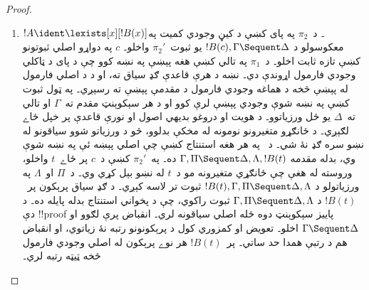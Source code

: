 \documentclass[../../../include/open-logic-section]{subfiles}
\begin{document}
\begin{proof}
\begin{enumerate}
کنه، ترلاسه شوے شي سم ثبوت نۀ دے، ځکه د $\lforall[x][!B(x)]$ هغه !!{formula}s مو لرې کړي چې د \LeftR{\lforall} په ځينو استنتاجونو کښې فعال وو۔ دغه استنتاجونه مو په دې بڼه «استنتاجونو» بدل کړي دي:
\[
  \AxiomC{}
  \RightLabel{$\pi_t$}
  \Deduce$!B(t), \Pi \fCenter \Lambda$
  \RightLabel{\LeftR{\lforall}}
  \UnaryInf$\Pi \fCenter \Lambda$
  \DisplayProof
  \]
له پاسه تر ښکته د ثبوت ونې ته راځو۔ په هره څانګه کښې د زياتېدونکو سياقونو له نښو څخه ځانګړي متغيرونه تازه کوو۔ تر تعويض مخکې د~$t$ له نښو څخه د~$\pi_1'$ ځانګړي متغيرونه هم تازه کوو۔ په هرې قاعدې کښې يو شان اضافي سياقونه ساتو او هر داسې «استنتاج» په دې بدلوو:
\[
  \AxiomC{}
  \RightLabel{$\Subst{\pi_1'}{t}{c}[\Pi \Sequent \Lambda]$}
  \Deduce$\Gamma, \Pi \fCenter \Delta, \Lambda, !B(t)$
  \AxiomC{}
  \RightLabel{$\pi_t[\Gamma \Sequent \Delta]$}
  \Deduce$!B(t), \Gamma, \Pi \fCenter \Delta, \Lambda$
  \RightLabel{\CutCS}
  \BinaryInf$\Gamma, \Pi \fCenter \Delta, \Lambda$
  \DisplayProof
  \]
د ونې په هر سېکوېنټ کښې د~$\Gamma$ او~$\Delta$ يو يو نقل ورزياتېږي۔ په رسم کښې ښے فرعي !!{proof} د پخوانۍ مقدمې له پاسه تر ښکته رغول شوې بڼه ده، چې اضافي سياق هم لري۔ دا بدلون د \LeftR{\lforall} په هر هغه ځاے کښې کوو چې اصلي پېښه ئې په نښه وي۔ نورې قاعدې خپل ګډ سياق ساتي۔ پاييز سېکوېنټ $\Gamma, \Gamma \Sequent \Delta, \Delta$ دے۔ د انقباض د منلو وړتيا ولګوئ، چې د~$\Gamma \Sequent \Delta$ يو !!a{proof} شي، او $\pi$ پرې بدل کړئ۔ پر $\lforall[x][!B(x)]$ يو پرېکون مو پر $!B(t)$ په (ښايي ډېرو) پرېکونونو بدل کړ، خو دا ټول د ټيټې رتبې دي۔ په $\pi_1$ يا $\pi_2$ کښې پخوا موجود پرېکونونه هم پاتې وي، خو هغه هم ټول د ټيټې رتبې دي۔
  \item $!A \ident \lexists[x][!B(x)]$۔ د~$\pi_2$ په پای کښې د کيڼ وجودي کميت په معکوسولو د $!B(c), \Gamma \Sequent \Delta$ يو ثبوت~$\pi_2'$ واخلو۔ $c$ په دواړو اصلي ثبوتونو کښې تازه ثابت اخلو۔ د~$\pi_1$ په تالي کښې هغه پېښې په نښه کوو چې د پای د ټاکلي وجودي فارمول اړوندې دي۔ نښه د هرې قاعدې ګډ سياق ته، او د \RightR{\lexists} د اصلي فارمول له پېښې څخه د هماغه وجودي فارمول د مقدمې پېښې ته رسېږي۔ په ټول ثبوت کښې په نښه شوې وجودي پېښې لرې کوو او د هر سېکوېنټ مقدم ته~$\Gamma$ او تالي ته~$\Delta$ يو ځل ورزياتوو۔ د هويت او دروغو بديهي اصول او نورې قاعدې پر خپل ځاے لګېږي۔ د ځانګړو متغيرونو نومونه له مخکې بدلوو، څو د ورزياتو شوو سياقونو له نښو سره ګډ نۀ شي۔
  د~\RightR{\lexists} په هر هغه استنتاج کښې چې اصلي پېښه ئې په نښه شوې وي، بدله مقدمه $\Gamma, \Pi \Sequent \Delta, \Lambda, !B(t)$ ده۔ په~$\pi_2'$ کښې د~$c$ پر ځاے~$t$ واخلو، وروسته له هغې چې ځانګړي متغيرونه مو د~$t$ له نښو بېل کړي وي۔ د~$\Pi$ او~$\Lambda$ په ورزياتولو د $!B(t), \Gamma, \Pi \Sequent \Delta, \Lambda$ ثبوت تر لاسه کېږي۔ د ګډ سياق پرېکون پر~$!B(t)$ د $\Gamma, \Pi \Sequent \Delta, \Lambda$ ثبوت راکوي، چې د پخواني استنتاج بدله پايله ده۔ د دې !!{proof} پاييز سېکوېنټ دوه ځله اصلي سياقونه لري۔ انقباض پرې لګوو او $\Gamma \Sequent \Delta$ اخلو۔ تعويض او کمزوري کول د پرېکونونو رتبه نۀ زياتوي، او انقباض هم د رتبې همدا حد ساتي۔ پر~$!B(t)$ هر نوے پرېکون له اصلي وجودي فارمول څخه ټيټه رتبه لري۔
\end{enumerate}
\end{proof}
\end{document}
